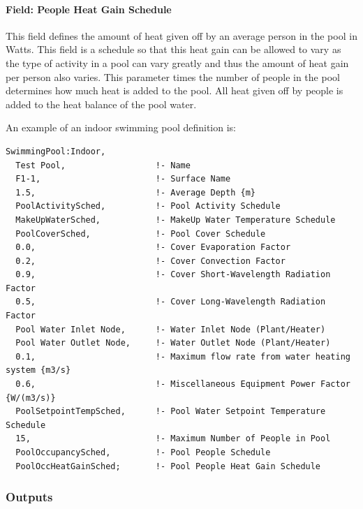 \paragraph{Field: People Heat Gain Schedule}\label{field-people-heat-gain-schedule}

This field defines the amount of heat given off by an average person in the pool in Watts. This field is a schedule so that this heat gain can be allowed to vary as the type of activity in a pool can vary greatly and thus the amount of heat gain per person also varies. This parameter times the number of people in the pool determines how much heat is added to the pool. All heat given off by people is added to the heat balance of the pool water.

An example of an indoor swimming pool definition is:

\begin{lstlisting}
SwimmingPool:Indoor,
  Test Pool,                  !- Name
  F1-1,                       !- Surface Name
  1.5,                        !- Average Depth {m}
  PoolActivitySched,          !- Pool Activity Schedule
  MakeUpWaterSched,           !- MakeUp Water Temperature Schedule
  PoolCoverSched,             !- Pool Cover Schedule
  0.0,                        !- Cover Evaporation Factor
  0.2,                        !- Cover Convection Factor
  0.9,                        !- Cover Short-Wavelength Radiation Factor
  0.5,                        !- Cover Long-Wavelength Radiation Factor
  Pool Water Inlet Node,      !- Water Inlet Node (Plant/Heater)
  Pool Water Outlet Node,     !- Water Outlet Node (Plant/Heater)
  0.1,                        !- Maximum flow rate from water heating system {m3/s}
  0.6,                        !- Miscellaneous Equipment Power Factor {W/(m3/s)}
  PoolSetpointTempSched,      !- Pool Water Setpoint Temperature Schedule
  15,                         !- Maximum Number of People in Pool
  PoolOccupancySched,         !- Pool People Schedule
  PoolOccHeatGainSched;       !- Pool People Heat Gain Schedule
\end{lstlisting}

\subsubsection{Outputs}\label{outputs-4-007}

